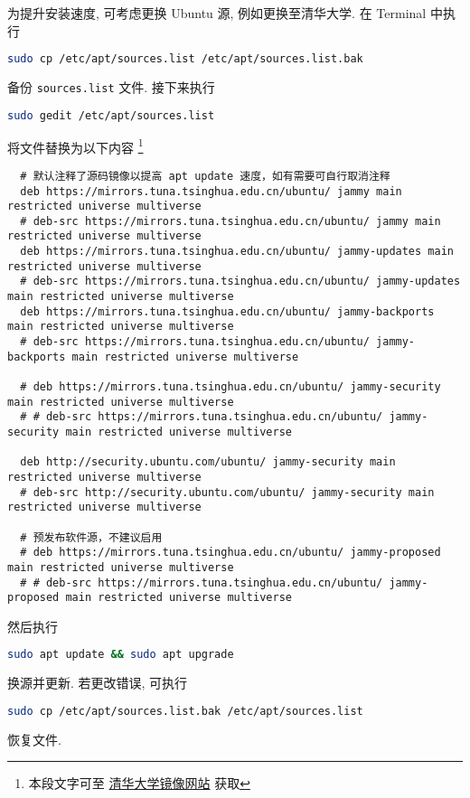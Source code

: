 为提升安装速度, 可考虑更换 Ubuntu 源, 例如更换至清华大学.
在 \textsf{Terminal} 中执行
\begin{lstlisting}[language = bash]
  sudo cp /etc/apt/sources.list /etc/apt/sources.list.bak
\end{lstlisting}
备份 \texttt{sources.list} 文件.
接下来执行
\begin{lstlisting}[language = bash]
  sudo gedit /etc/apt/sources.list
\end{lstlisting}
将文件替换为以下内容%
\footnote{本段文字可至%
  \href{https://mirrors.tuna.tsinghua.edu.cn/help/ubuntu/}{清华大学镜像网站}%
  获取}
\begin{lstlisting}
  # 默认注释了源码镜像以提高 apt update 速度，如有需要可自行取消注释
  deb https://mirrors.tuna.tsinghua.edu.cn/ubuntu/ jammy main restricted universe multiverse
  # deb-src https://mirrors.tuna.tsinghua.edu.cn/ubuntu/ jammy main restricted universe multiverse
  deb https://mirrors.tuna.tsinghua.edu.cn/ubuntu/ jammy-updates main restricted universe multiverse
  # deb-src https://mirrors.tuna.tsinghua.edu.cn/ubuntu/ jammy-updates main restricted universe multiverse
  deb https://mirrors.tuna.tsinghua.edu.cn/ubuntu/ jammy-backports main restricted universe multiverse
  # deb-src https://mirrors.tuna.tsinghua.edu.cn/ubuntu/ jammy-backports main restricted universe multiverse

  # deb https://mirrors.tuna.tsinghua.edu.cn/ubuntu/ jammy-security main restricted universe multiverse
  # # deb-src https://mirrors.tuna.tsinghua.edu.cn/ubuntu/ jammy-security main restricted universe multiverse

  deb http://security.ubuntu.com/ubuntu/ jammy-security main restricted universe multiverse
  # deb-src http://security.ubuntu.com/ubuntu/ jammy-security main restricted universe multiverse

  # 预发布软件源，不建议启用
  # deb https://mirrors.tuna.tsinghua.edu.cn/ubuntu/ jammy-proposed main restricted universe multiverse
  # # deb-src https://mirrors.tuna.tsinghua.edu.cn/ubuntu/ jammy-proposed main restricted universe multiverse
\end{lstlisting}
然后执行
\begin{lstlisting}[language=bash]
  sudo apt update && sudo apt upgrade
\end{lstlisting}
换源并更新.
若更改错误,
可执行
\begin{lstlisting}[language=bash]
  sudo cp /etc/apt/sources.list.bak /etc/apt/sources.list
\end{lstlisting}
恢复文件.

